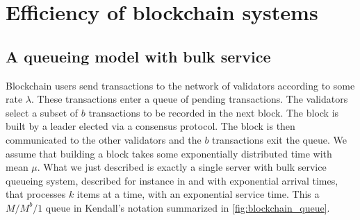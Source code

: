 \chapter{Efficiency of blockchain systems}\label{chap:efficiency}

\section{A queueing model with bulk service}\label{sec:queue}
Blockchain users send transactions to the network of validators according to some rate $\lambda$. These transactions enter a queue of pending transactions. The validators select a subset of $b$ transactions to be recorded in the next block. The block is built by a leader elected via a consensus protocol. The block is then communicated to the other validators and the $b$ transactions exit the queue. We assume that building a block takes some exponentially distributed time with mean $\mu$. What we just described is exactly a single server with bulk service queueing system, described for instance in \citet{Bailey1954} and \citet{Chaudhry1981} with exponential arrival times, that processes $k$ items at a time, with an exponential service time. This a $M/M^b/1$ queue in Kendall's notation summarized in \cref{fig:blockchain_queue}.  
